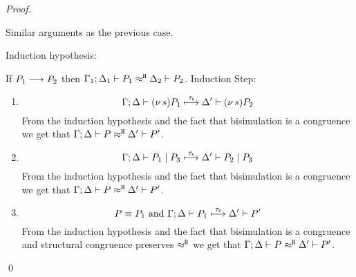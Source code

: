 \begin{proof}
\begin{enumerate}
		\noi Similar arguments as the previous case.
	\end{enumerate}
	
	\noi Induction hypothesis:

	\noi If $P_1 \longrightarrow P_2$ then $\Gamma_1; \Delta_1 \vdash P_1 \approx^\mathtt{H} \Delta_2 \vdash P_2$.
	\noi Induction Step:
	\begin{enumerate}
		\item %
		\[
			\Gamma; \Delta \vdash (\nu\, s){P_1} \stackrel{\tau_{\mathsf{s}}}{\longmapsto} \Delta' \vdash (\nu\, s) P_2
		\]
		\noi From the induction hypothesis and the fact that bisimulation is a congruence
		we get that $\Gamma; \Delta \vdash P \approx^\mathtt{H} \Delta' \vdash P'$.

		\item  %
		\[
			\Gamma; \Delta \vdash P_1 \;|\; P_3 \stackrel{\tau_{\mathsf{s}}}{\longmapsto} \Delta' \vdash P_2 \;|\; P_3
		\]
		\noi From the induction hypothesis and the fact that bisimulation is a congruence
		we get that $\Gamma; \Delta \vdash P \approx^\mathtt{H} \Delta' \vdash P'$.

		\item   %
			\[
				P \equiv P_1 \text{ and }\Gamma; \Delta \vdash P_1 \stackrel{\tau_{\mathsf{s}}}{\longmapsto} \Delta' \vdash P'
			\]
%
		From the induction hypothesis and the fact that bisimulation is a congruence 
		and structural congruence preserves $\approx^\mathtt{H}$
		we get that $\Gamma; \Delta \vdash P \approx^\mathtt{H} \Delta' \vdash P'$.
	\end{enumerate}
	\qed
\end{proof}


